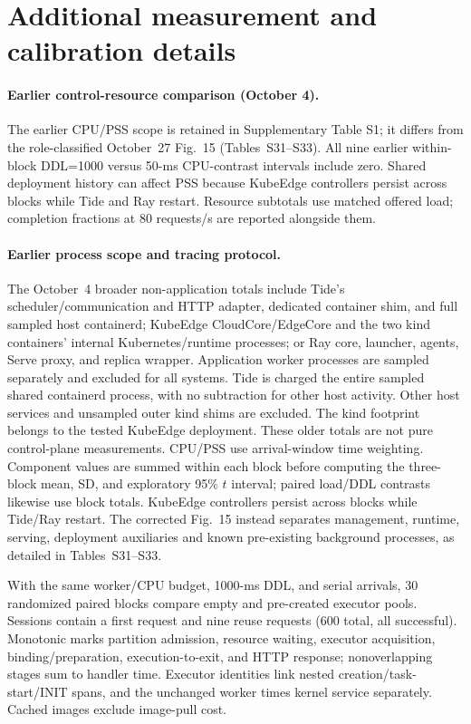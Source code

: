 \section*{Additional measurement and calibration details}
\label{sec:measurement-notes}
\paragraph{Earlier control-resource comparison (October 4).}
The earlier CPU/PSS scope is retained in Supplementary Table S1; it differs from the role-classified October~27 Fig.~15 (Tables~S31--S33). All nine earlier within-block DDL=1000 versus 50-ms CPU-contrast intervals include zero. Shared deployment history can affect PSS because KubeEdge controllers persist across blocks while Tide and Ray restart. Resource subtotals use matched offered load; completion fractions at 80 requests/s are reported alongside them.

\paragraph{Earlier process scope and tracing protocol.}
The October~4 broader non-application totals include Tide's scheduler/communication and HTTP adapter, dedicated container shim, and full sampled host containerd; KubeEdge CloudCore/EdgeCore and the two kind containers' internal Kubernetes/runtime processes; or Ray core, launcher, agents, Serve proxy, and replica wrapper. Application worker processes are sampled separately and excluded for all systems. Tide is charged the entire sampled shared containerd process, with no subtraction for other host activity. Other host services and unsampled outer kind shims are excluded. The kind footprint belongs to the tested KubeEdge deployment. These older totals are not pure control-plane measurements. CPU/PSS use arrival-window time weighting. Component values are summed within each block before computing the three-block mean, SD, and exploratory 95\% $t$ interval; paired load/DDL contrasts likewise use block totals. KubeEdge controllers persist across blocks while Tide/Ray restart. The corrected Fig.~15 instead separates management, runtime, serving, deployment auxiliaries and known pre-existing background processes, as detailed in Tables~S31--S33.

With the same worker/CPU budget, 1000-ms DDL, and serial arrivals, 30 randomized paired blocks compare empty and pre-created executor pools. Sessions contain a first request and nine reuse requests (600 total, all successful). Monotonic marks partition admission, resource waiting, executor acquisition, binding/preparation, execution-to-exit, and HTTP response; nonoverlapping stages sum to handler time. Executor identities link nested creation/task-start/INIT spans, and the unchanged worker times kernel service separately. Cached images exclude image-pull cost.

